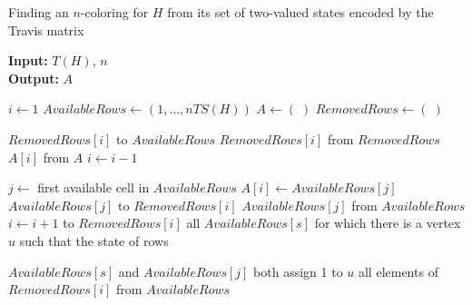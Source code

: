 \documentclass[%
12pt,
prereprint,
showpacs,
showkeys,
preprintnumbers,
amsmath,amssymb,
aps,
pra,
longbibliography,
notitlepage
]{revtex4-1}
\theoremstyle{definition}
\begin{document}
	\def\NoNumber#1{{\def\alglinenumber##1{}\State #1}\addtocounter{ALG@line}{-1}}
	
	\begin{algorithm}
		\caption{Finding an $n$-coloring for $H$  from its set of two-valued states encoded by the Travis matrix}\label{algorithm1}
		\begin{flushleft} $\;$\\ \hspace*{\algorithmicindent}
			\textbf{Input:} $T(H)$, $n$ \\
			\hspace*{\algorithmicindent} \textbf{Output:} $A$ 
		\end{flushleft}
		\begin{algorithmic}[1]
			
			\State $i\gets 1$ 
			\State $AvailableRows\gets (1,\ldots,nTS(H))$
			\State $A\gets (\;)$
			\State $RemovedRows\gets (\;)$ 
			\NoNumber{ }
			 
			
			 
			
			 $RemovedRows[i]$ to $AvailableRows$
			 $RemovedRows[i]$ from $RemovedRows$
			 $A[i]$ from $A$
			\State $i\gets i-1$
			
			\Else {}
			
			\State $j\gets$ first available cell in $AvailableRows$
			\State $A[i] \gets AvailableRows[j]$
			 $AvailableRows[j]$ to $RemovedRows[i]$
			 $AvailableRows[j]$ from $AvailableRows$
			\State $i\gets i+1$
			 to $RemovedRows[i]$ all $AvailableRows[s]$  for which there is a vertex $u$
			\NoNumber{\hspace{1.2 cm}such that the state of rows}
			$AvailableRows[s]$ and $AvailableRows[j]$ both assign 1 to $u$
			 all elements of $RemovedRows[i]$ from $AvailableRows$
			\EndIf
			
			\EndWhile
		\end{algorithmic}
	\end{algorithm}
	
\end{document}
